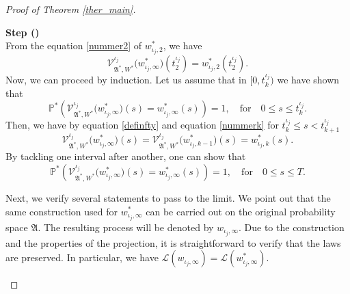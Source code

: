 \documentclass[english,a4paper,11pt]{amsart}
\theoremstyle{plain}
\theoremstyle{definition}
\theoremstyle{remark}
\numberwithin{equation}{section}
\newcounter{lil1}
\newenvironment{step}
{\begin{list} { \bf Step (\Roman{lil1})}
		{ \usecounter{lil1}
			\setlength{\leftmargin}{0.0cm}
			\setlength{\topsep}{0.2cm}
			\setlength{\itemsep}{0.0cm}
			\setlength{\parsep}{0.1cm}
			\setlength{\itemindent}{0.8cm}
			\setlength{\parskip}{0.0cm}}}
	{\end{list}}
\newcounter{lil33}
\newcounter{lil1q}
\newcommand{\bcase}{\begin{cases}}
\newcommand{\ecase}{\end{cases}}
\newcommand\del[1]{}
\newcommand\del[1]{}
\newcommand{\NN}{\mathbb{N}}
\newcommand{\PP}{{\mathbb{P}}}
\newcommand{\Pro}{Pro}
\begin{document}
\begin{proof}[Proof of Theorem \ref{ther_main}]
\begin{step}
$$$$
From the equation \eqref{nummer2} of $ w^\ast_{\iota_j,2}$,  we have 
$$
\mathcal{V}_{\mathfrak{A}^\ast,W^\ast}^{\iota_j}\big(w^\ast_{\iota_j,\infty}\big)(t^{\iota_j}_2)=w^\ast_{\iota_j,2}(t^{\iota_j}_2).
$$
%
Now, we can proceed by induction. Let us assume that in $[0,t^{\iota_j}_k)$ we have shown that 
\begin{equation*}
\PP^\ast\left(
\mathcal{V}_{\mathfrak{A}^\ast,W^\ast}^{\iota_j}\big(w^\ast_{\iota_j,\infty }\big) (s) =w^\ast_{\iota_j,\infty}(s)\right)=1, \quad \mbox{for} \quad 0\le s\le t^{\iota_j}_k
.
\end{equation*}
Then,  we have by equation \eqref{definfty} and equation \eqref{nummerk} for $t^{\iota_j}_k\le s< t^{\iota_j}_{k+1}$
$$
\mathcal{V}_{\mathfrak{A}^\ast,W^\ast}^{\iota_j}\big(w^\ast_{\iota_j,\infty}\big) (s) =\mathcal{V}_{\mathfrak{A}^\ast,W^\ast}^{\iota_j}\big(w^\ast_{\iota_j,k-1}\big)(s)=w^\ast_{\iota_j,k}(s).
$$
By tackling one interval after another, one can show that
%
\begin{equation*}
	\PP^\ast\left(
	\mathcal{V}_{\mathfrak{A}^\ast,W^\ast}^{\iota_j}\big(w^\ast_{\iota_j,\infty }\big) (s) =w^\ast_{\iota_j,\infty}(s)\right)=1, \quad \mbox{for} \quad 0\le s\le T
	.
\end{equation*}

\del{ \item 

We have to identify the limit
of the sequence $\{w^\ast_{\iota_j,\infty}:j\in\NN\}$.	
Note, the definition of given by\begin{eqnarray}\label{hatdefined-1} \Pro_n(\xi)(s):=
	\bcase w_n, &
	\mbox{ if } s\in [0,T2^{-n}),
	\\
	\frac{2^n}{T}\int_{\phi_n(s)-T2^{-n}}^{\phi_n(s)} \xi(r)\: dr, &\mbox{ if
	} s\geq T2^{-n}.\ecase
\end{eqnarray}
and 
$$
\mathcal{V}^\iota _{\mathfrak{A},W}(\xi):=  (\Pro_{n_\iota} \circ\mathcal{V}_{\mathfrak{A},W})(\xi),\quad \xi\in \mathcal{X}(\mathfrak{A}).
$$

}

\item


Next, we verify several statements to pass to the limit. We point out that the same construction used for $w^\ast_{\iota_j,\infty}$ can be carried out on the original probability space $\mathfrak{A}$.
The resulting process will be denoted by $w_{\iota_j,\infty}$.
Due to the construction and the properties of the projection, it is straightforward to verify that the laws are preserved. In particular, we have $\mathscr{L}(w_{\iota_j,\infty}) = \mathscr{L}(w^\ast_{\iota_j,\infty})$.


\end{step}
\end{proof}
\end{document}
